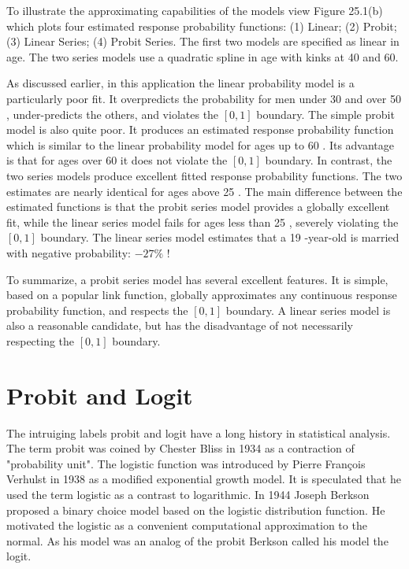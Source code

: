 \documentclass[10pt]{article}
\begin{document}
To illustrate the approximating capabilities of the models view Figure 25.1(b) which plots four estimated response probability functions: (1) Linear; (2) Probit; (3) Linear Series; (4) Probit Series. The first two models are specified as linear in age. The two series models use a quadratic spline in age with kinks at 40 and 60.

As discussed earlier, in this application the linear probability model is a particularly poor fit. It overpredicts the probability for men under 30 and over 50 , under-predicts the others, and violates the $[0,1]$ boundary. The simple probit model is also quite poor. It produces an estimated response probability function which is similar to the linear probability model for ages up to 60 . Its advantage is that for ages over 60 it does not violate the $[0,1]$ boundary. In contrast, the two series models produce excellent fitted response probability functions. The two estimates are nearly identical for ages above 25 . The main difference between the estimated functions is that the probit series model provides a globally excellent fit, while the linear series model fails for ages less than 25 , severely violating the $[0,1]$ boundary. The linear series model estimates that a 19 -year-old is married with negative probability: $-27 \%$ !

To summarize, a probit series model has several excellent features. It is simple, based on a popular link function, globally approximates any continuous response probability function, and respects the $[0,1]$ boundary. A linear series model is also a reasonable candidate, but has the disadvantage of not necessarily respecting the $[0,1]$ boundary.

\section{Probit and Logit}
The intruiging labels probit and logit have a long history in statistical analysis. The term probit was coined by Chester Bliss in 1934 as a contraction of "probability unit". The logistic function was introduced by Pierre François Verhulst in 1938 as a modified exponential growth model. It is speculated that he used the term logistic as a contrast to logarithmic. In 1944 Joseph Berkson proposed a binary choice model based on the logistic distribution function. He motivated the logistic as a convenient computational approximation to the normal. As his model was an analog of the probit Berkson called his model the logit.
\end{document}

